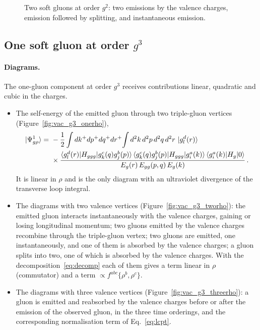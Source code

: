 \begin{figure}[t]
\centering
{}\qquad{}\qquad{}
\caption{Two soft gluons at order $g^2$: two emissions by the valence charges, emission followed by splitting, and instantaneous emission.}
\label{fig:vac_gg}
\end{figure}

\subsection{One soft gluon at order \texorpdfstring{$g^3$}{g3}}

\paragraph{Diagrams.} The one-gluon component at order $g^3$ receives contributions linear, quadratic and cubic in the charges.
\begin{itemize}
\item The self-energy of the emitted gluon through two triple-gluon vertices (Figure~\ref{fig:vac_g3_onerho}),
\begin{align}
\ket{\Psi^{1}_{g\rho}}=\ &-\frac12\int dk^+dp^+dq^+dr^+\!\int d^2k\,d^2p\,d^2q\,d^2r\,\ket{g^d_l(r)}\notag\\&\times\frac{\braket{g^d_l(r)|H_{ggg}|g^c_k(q)g^b_j(p)}\braket{g^c_k(q)g^b_j(p)|H_{ggg}|g^a_i(k)}\braket{g^a_i(k)|H_g|0}}{E_g(r)\,E_{gg}(p,q)\,E_g(k)}\,.
\end{align}
It is linear in $\rho$ and is the only diagram with an ultraviolet divergence of the transverse loop integral.
\item The diagrams with two valence vertices (Figure~\ref{fig:vac_g3_tworho}): the emitted gluon interacts instantaneously with the valence charges, gaining or losing longitudinal momentum; two gluons emitted by the valence charges recombine through the triple-gluon vertex; two gluons are emitted, one instantaneously, and one of them is absorbed by the valence charges; a gluon splits into two, one of which is absorbed by the valence charges. With the decomposition~\eqref{eq:decomp} each of them gives a term linear in $\rho$ (commutator) and a term $\propto f^{abc}\{\rho^b,\rho^c\}$.
\item The diagrams with three valence vertices (Figure~\ref{fig:vac_g3_threerho}): a gluon is emitted and reabsorbed by the valence charges before or after the emission of the observed gluon, in the three time orderings, and the corresponding normalisation term of Eq.~\eqref{eq:lcpt}.
\end{itemize}

